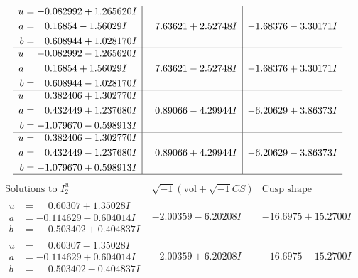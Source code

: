 \documentclass[1p]{elsarticle_modified}
\theoremstyle{definition}
\newcommand{\I}{\sqrt{-1}}
\begin{document}
$$\begin{array}{c|c|c}
\begin{aligned}
u &= -0.082992 + 1.265620 I \\
a &= \phantom{-}0.16854 - 1.56029 I \\
b &= \phantom{-}0.608944 + 1.028170 I\end{aligned}
 & \phantom{-}7.63621 + 2.52748 I & -1.68376 - 3.30171 I \\ \hline\begin{aligned}
u &= -0.082992 - 1.265620 I \\
a &= \phantom{-}0.16854 + 1.56029 I \\
b &= \phantom{-}0.608944 - 1.028170 I\end{aligned}
 & \phantom{-}7.63621 - 2.52748 I & -1.68376 + 3.30171 I \\ \hline\begin{aligned}
u &= \phantom{-}0.382406 + 1.302770 I \\
a &= \phantom{-}0.432449 + 1.237680 I \\
b &= -1.079670 - 0.598913 I\end{aligned}
 & \phantom{-}0.89066 - 4.29944 I & -6.20629 + 3.86373 I \\ \hline\begin{aligned}
u &= \phantom{-}0.382406 - 1.302770 I \\
a &= \phantom{-}0.432449 - 1.237680 I \\
b &= -1.079670 + 0.598913 I\end{aligned}
 & \phantom{-}0.89066 + 4.29944 I & -6.20629 - 3.86373 I\\
 \hline 
 \end{array}$$\newpage$$\begin{array}{c|c|c}  
\text{Solutions to }I^u_{2}& \I (\text{vol} + \sqrt{-1}CS) & \text{Cusp shape}\\
 \hline 
\begin{aligned}
u &= \phantom{-}0.60307 + 1.35028 I \\
a &= -0.114629 - 0.604014 I \\
b &= \phantom{-}0.503402 + 0.404837 I\end{aligned}
 & -2.00359 - 6.20208 I & -16.6975 + 15.2700 I \\ \hline\begin{aligned}
u &= \phantom{-}0.60307 - 1.35028 I \\
a &= -0.114629 + 0.604014 I \\
b &= \phantom{-}0.503402 - 0.404837 I\end{aligned}
 & -2.00359 + 6.20208 I & -16.6975 - 15.2700 I \\ \hline\begin{aligned}

\end{aligned}
\end{array}$$
\end{document}
